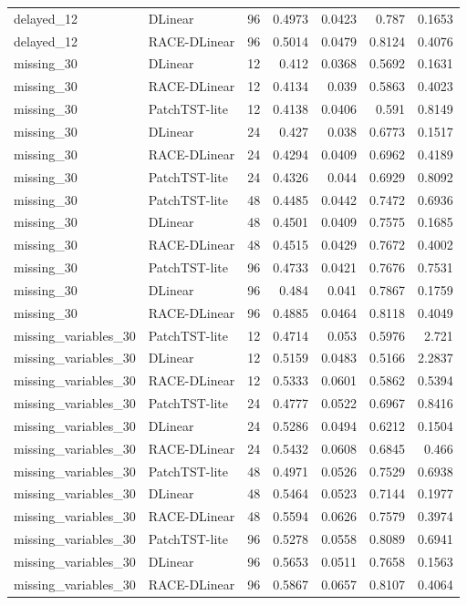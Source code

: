 \begin{table}[t]
{\begin{tabular}{llrrrrr}
delayed\_12 & DLinear & 96 & 0.4973 & 0.0423 & 0.787 & 0.1653 \\
delayed\_12 & RACE-DLinear & 96 & 0.5014 & 0.0479 & 0.8124 & 0.4076 \\
missing\_30 & DLinear & 12 & 0.412 & 0.0368 & 0.5692 & 0.1631 \\
missing\_30 & RACE-DLinear & 12 & 0.4134 & 0.039 & 0.5863 & 0.4023 \\
missing\_30 & PatchTST-lite & 12 & 0.4138 & 0.0406 & 0.591 & 0.8149 \\
missing\_30 & DLinear & 24 & 0.427 & 0.038 & 0.6773 & 0.1517 \\
missing\_30 & RACE-DLinear & 24 & 0.4294 & 0.0409 & 0.6962 & 0.4189 \\
missing\_30 & PatchTST-lite & 24 & 0.4326 & 0.044 & 0.6929 & 0.8092 \\
missing\_30 & PatchTST-lite & 48 & 0.4485 & 0.0442 & 0.7472 & 0.6936 \\
missing\_30 & DLinear & 48 & 0.4501 & 0.0409 & 0.7575 & 0.1685 \\
missing\_30 & RACE-DLinear & 48 & 0.4515 & 0.0429 & 0.7672 & 0.4002 \\
missing\_30 & PatchTST-lite & 96 & 0.4733 & 0.0421 & 0.7676 & 0.7531 \\
missing\_30 & DLinear & 96 & 0.484 & 0.041 & 0.7867 & 0.1759 \\
missing\_30 & RACE-DLinear & 96 & 0.4885 & 0.0464 & 0.8118 & 0.4049 \\
missing\_variables\_30 & PatchTST-lite & 12 & 0.4714 & 0.053 & 0.5976 & 2.721 \\
missing\_variables\_30 & DLinear & 12 & 0.5159 & 0.0483 & 0.5166 & 2.2837 \\
missing\_variables\_30 & RACE-DLinear & 12 & 0.5333 & 0.0601 & 0.5862 & 0.5394 \\
missing\_variables\_30 & PatchTST-lite & 24 & 0.4777 & 0.0522 & 0.6967 & 0.8416 \\
missing\_variables\_30 & DLinear & 24 & 0.5286 & 0.0494 & 0.6212 & 0.1504 \\
missing\_variables\_30 & RACE-DLinear & 24 & 0.5432 & 0.0608 & 0.6845 & 0.466 \\
missing\_variables\_30 & PatchTST-lite & 48 & 0.4971 & 0.0526 & 0.7529 & 0.6938 \\
missing\_variables\_30 & DLinear & 48 & 0.5464 & 0.0523 & 0.7144 & 0.1977 \\
missing\_variables\_30 & RACE-DLinear & 48 & 0.5594 & 0.0626 & 0.7579 & 0.3974 \\
missing\_variables\_30 & PatchTST-lite & 96 & 0.5278 & 0.0558 & 0.8089 & 0.6941 \\
missing\_variables\_30 & DLinear & 96 & 0.5653 & 0.0511 & 0.7658 & 0.1563 \\
missing\_variables\_30 & RACE-DLinear & 96 & 0.5867 & 0.0657 & 0.8107 & 0.4064 \\
\bottomrule
\end{tabular}
}
\end{table}
